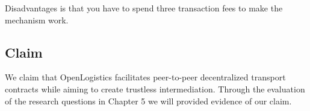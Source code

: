 Disadvantages is that you have to spend three transaction fees to make the mechanism work.

\subsection{Claim}

We claim that OpenLogistics facilitates peer-to-peer decentralized transport contracts while aiming to create trustless intermediation. Through the evaluation of the research questions in Chapter 5 we will provided evidence of our claim.
